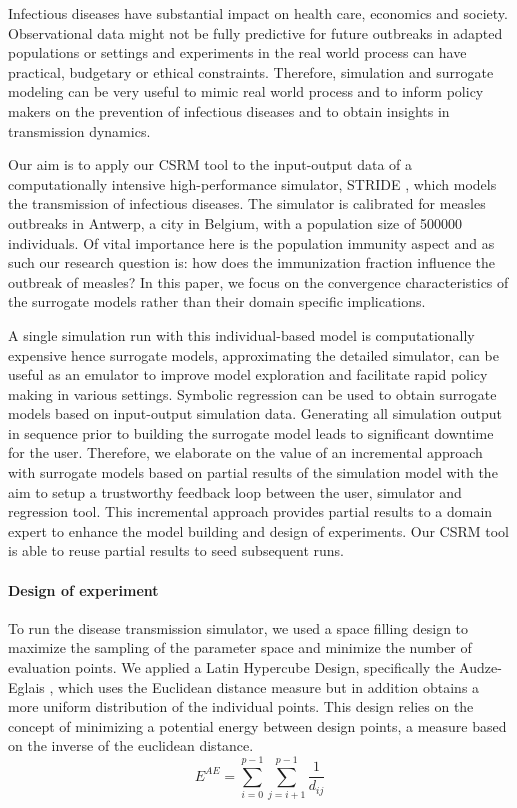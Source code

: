 
Infectious diseases have substantial impact on health care, economics and society. 
Observational data might not be fully predictive for future outbreaks in adapted populations or settings and experiments in the real world process can have practical, budgetary or ethical constraints. Therefore, simulation and surrogate modeling can be very useful to mimic real world process and to inform policy makers on the prevention of infectious diseases and to obtain insights in transmission dynamics.

Our aim is to apply our CSRM tool to the input-output data of a computationally intensive high-performance simulator, STRIDE \citep{stride}, which models the transmission of infectious diseases.
The simulator is calibrated for measles outbreaks in Antwerp, a city in Belgium, with a population size of 500000 individuals. Of vital importance here is the population immunity aspect and as such our research question is: how does the immunization fraction influence the outbreak of measles?
In this paper, we focus on the convergence characteristics of the surrogate models rather than their domain specific implications. 

A single simulation run with this individual-based model is computationally expensive hence surrogate models, approximating the detailed simulator, can be useful as an emulator to improve model exploration and facilitate rapid policy making in various settings. 
Symbolic regression can be used to obtain surrogate models based on input-output simulation data. Generating all simulation output in sequence prior to building the surrogate model leads to significant downtime for the user. 
Therefore, we elaborate on the value of an incremental approach with surrogate models based on partial results of the simulation model with the aim to setup a trustworthy feedback loop between the user, simulator and regression tool. 
This incremental approach provides partial results to a domain expert to enhance the model building and design of experiments. Our CSRM tool is able to reuse partial results to seed subsequent runs. %

\paragraph{Design of experiment}
To run the disease transmission simulator, we used a space filling design to maximize the sampling of the parameter space and minimize the number of evaluation points. We applied a Latin Hypercube Design, specifically the Audze-Eglais \citep{AudzeEglais, AudzeEglais2, AudzeEglais3}, which uses the Euclidean distance measure but in addition obtains a more uniform distribution of the individual points. This design relies on the concept of minimizing a potential energy between design points, a measure based on the inverse of the euclidean distance.
\[
E^{AE} = \sum_{i=0}^{p-1} {\sum_{j=i+1}^{p-1} {\frac{1}{d_{ij}}}}
\]

